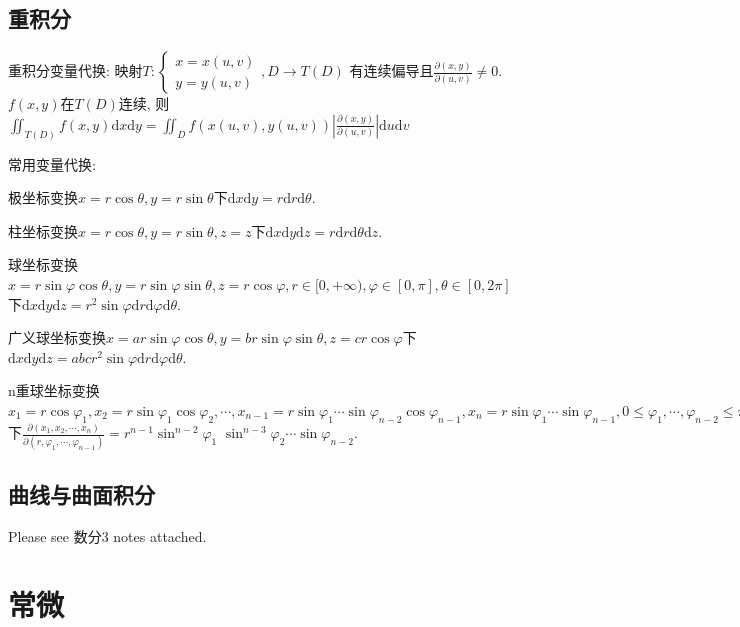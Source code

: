 \documentclass[UTF8]{ctexart}
\begin{document}
\subsection{重积分}

重积分变量代换:
映射$T:
\left\{\begin{matrix}
x=x(u,v)\\y=y(u,v)
\end{matrix}\right.,D\to T(D)$
有连续偏导且$\frac{\partial(x,y)}{\partial(u,v)}\neq 0$.
$f(x,y)$在$T(D)$连续, 则
$\iint_{T(D)}f(x,y)\mathrm{d}x\mathrm{d}y=\iint_{D} f(x(u,v), y(u,v))
\left|\frac{\partial(x,y)}{\partial(u,v)}\right| \mathrm{d}u\mathrm{d}v$


\noindent 常用变量代换:\par 
极坐标变换$x=r\cos\theta,y=r\sin\theta$下$\mathrm{d}x\mathrm{d}y=r\mathrm{d}r\mathrm{d}\theta$.\par 
柱坐标变换$x=r\cos\theta,y=r\sin\theta,z=z$下$\mathrm{d}x\mathrm{d}y\mathrm{d}z=r\mathrm{d}r\mathrm{d}\theta\mathrm{d}z$.\par 
球坐标变换$x=r\sin\varphi\cos\theta,y=r\sin\varphi\sin\theta,z=r\cos\varphi,
r\in[0,+\infty),\varphi\in[0,\pi],\theta\in[0,2\pi]$下$\mathrm{d}x\mathrm{d}y\mathrm{d}z
=r^2\sin\varphi \mathrm{d}r\mathrm{d}\varphi \mathrm{d}\theta$.\par 
广义球坐标变换$x=ar\sin\varphi\cos\theta,y=br\sin\varphi\sin\theta,z=cr\cos\varphi$下$\mathrm{d}x\mathrm{d}y\mathrm{d}z
=abcr^2\sin\varphi \mathrm{d}r\mathrm{d}\varphi \mathrm{d}\theta$.\par 
n重球坐标变换$x_{1}=r \cos \varphi_{1}, x_{2}=r \sin \varphi_{1} \cos \varphi_{2}, \cdots,
x_{n-1}=r \sin \varphi_{1}\cdots \sin \varphi_{n-2} \cos \varphi_{n-1},
x_{n}=r \sin \varphi_{1}\cdots\sin \varphi_{n-1},
0\leq \varphi_1,\cdots,\varphi_{n-2}\leq \pi,0\leq \varphi_{n-1}\leq 2\pi$下$
\frac{\partial\left(x_{1}, x_{2}, \cdots, x_{n}\right)}{\partial\left(r, \varphi_{1}, \cdots, \varphi_{n-1}\right)}=
r^{n-1} \sin ^{n-2} \varphi_{1}$
$\sin ^{n-3} \varphi_{2} \cdots \sin \varphi_{n-2} $.

\subsection{曲线与曲面积分}
Please see 数分3 notes attached.

\section{常微}
\end{document}
